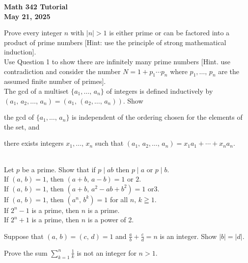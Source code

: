 \documentclass[a4paper,11pt]{article}
\theoremstyle{mythm}
\theoremstyle{mydef}
\newcommand{\abs}[1]{\left\vert #1 \right\vert}
\begin{document}
\begin{center}
  {\Large\bfseries Math 342 Tutorial} \\
  {\normalsize\bf May 21, 2025}
\end{center}

 Prove every integer $n$ with $\abs{n}>1$ is either
prime or can be factored into a product of prime numbers [Hint: use the
principle of strong mathematical induction]. \\

 Use Question 1 to show there are infinitely many
prime numbers [Hint. use contradiction and consider the number $N=1+p_1 \cdots
p_n$ where $p_1,\dots,\,p_n$ are the assumed finite number of primes]. \\

 The gcd of a multiset $\{a_1,\dots,\,a_n\}$ of
integers is defined inductively by
$(a_1,\,a_2,\dots,\,a_n)=(a_1,\,(a_2,\dots,\,a_n))$. Show
\begin{enumerate*}[{\bf (a)}]
\item the gcd of $\{a_1,\dots,\,a_n\}$ is independent of the ordering chosen for
  the elements of the set, and
\item there exists integers $x_1,\dots,\,x_n$ such that $(a_1,\,a_2,\dots,\,a_n)
  = x_1a_1 + \cdots + x_na_n$.
\end{enumerate*} \\

 Let $p$ be a prime. Show that if $p \mid ab$ then $p
\mid a$ or $p \mid b$. \\

 If $(a,\,b)=1$, then $(a+b,\,a-b)=1\text{ or }2$. \\

 If $(a,\,b)=1$, then $(a+b,\,a^2-ab+b^2)=1\text{ or
}3$. \\

 If $(a,\,b)=1$, then $(a^n,\,b^k)=1$ for all $n,\,k
\geqq 1$. \\

 If $2^n-1$ is a prime, then $n$ is a prime. \\

 If $2^n+1$ is a prime, then $n$ is a power of 2. \\

\begin{enumerate*}[{\bf (a)}]
\item Suppose that $(a,\,b) = (c,\,d) = 1$ and $\frac{a}{b}+\frac{c}{d}=n$ is an
  integer. Show $\abs{b}=\abs{d}$.
\item Prove the sum $\sum_{k=1}^n\frac{1}{k}$ is not an integer for $n > 1$.
\end{enumerate*} \\
\end{document}
